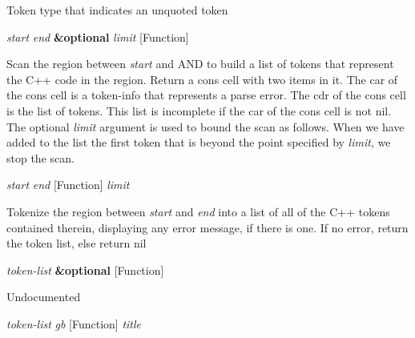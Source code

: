 \begin{doc-string}
Token type that indicates an unquoted token
\end{doc-string}

\vspace{1em}
\noindent
{}
\usebox{\funcname}\emph{start} \emph{end} \textbf{\&optional} \emph{limit}
 \hfill [Function]

\begin{doc-string}
Scan the region between \emph{start} and AND to build a list of tokens that represent the C++
code in the region.  Return a cons cell with two items in it.  The car of the cons cell
is a token-info that represents a parse error.  The cdr of the cons cell is the list of
tokens.  This list is incomplete if the car of the cons cell is not nil.  The optional
\emph{limit} argument is used to bound the scan as follows.  When we have added to the list the
first token that is beyond the point specified by \emph{limit}, we stop the scan.
\end{doc-string}

\vspace{1em}
\noindent
{}
\usebox{\funcname}\emph{start} \emph{end}
 \hfill [Function]
\hspace*{\wd\funcname}\emph{limit}

\begin{doc-string}
Tokenize the region between \emph{start} and \emph{end} into a list of all of the C++
tokens contained therein, displaying any error message, if there is one.  If no
error, return the token list, else return nil
\end{doc-string}

\vspace{1em}
\noindent
{}
\usebox{\funcname}\emph{token-list} \textbf{\&optional}
 \hfill [Function]
\hspace*{\wd\funcname}

\begin{doc-string}
Undocumented
\end{doc-string}

\vspace{1em}
\noindent
{}
\usebox{\funcname}\emph{token-list} \emph{gb}
 \hfill [Function]
\hspace*{\wd\funcname}\emph{title}

